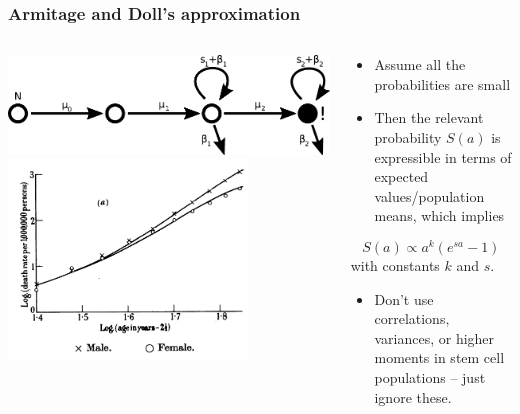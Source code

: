 \documentclass{beamer}
\begin{document}
\begin{frame}
\end{frame}


\begin{frame}
    \frametitle{Armitage and Doll's approximation}

    \begin{columns}
        \begin{column}{0.5\textwidth}
            \includegraphics[width=1.00\textwidth]{figures/diagram3}
            \includegraphics[width=0.75\textwidth]{figures/ArmitageDoll1957_4A.png}
        \end{column}
        \begin{column}{0.5\textwidth}
        \begin{itemize}
            \item Assume all the probabilities are small
            \item Then the relevant probability $S(a)$ is expressible in terms
            of expected values/population means, which implies
        \end{itemize}
        \begin{equation}
            S(a) \propto a^k (e^{s a} - 1)
        \end{equation}
        with constants $k$ and $s$.
        \begin{itemize}
            \item Don't use correlations, variances, or higher moments in stem
            cell populations -- just ignore these.
        \end{itemize}
        \end{column}
    \end{columns}
\end{frame}
\end{document}
